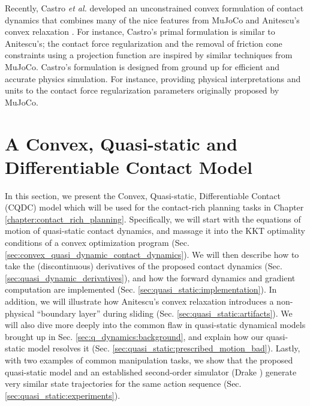 Recently, Castro \textit{et al.} developed an unconstrained convex formulation of contact dynamics \cite{castro2021unconstrained} that combines many of the nice features from MuJoCo \cite{todorov2012mujoco} and Anitescu's convex relaxation \cite{anitescu2006optimization}. For instance, Castro's primal formulation is similar to Anitescu's; the contact force regularization and the removal of friction cone constraints using a projection function are inspired by similar techniques from MuJoCo. 
Castro's formulation is designed from ground up for efficient and accurate physics simulation. For instance,  providing physical interpretations and units to the contact force regularization parameters originally proposed by MuJoCo.


\section{A Convex, Quasi-static and Differentiable Contact Model} \label{sec:q_dynamics:cqdc}
In this section, we present the Convex, Quasi-static, Differentiable Contact (CQDC) model which will be used for the contact-rich planning tasks in Chapter \ref{chapter:contact_rich_planning}. Specifically, we will start with the equations of motion of quasi-static contact dynamics, and massage it into the KKT optimality conditions of a convex optimization program (Sec. \ref{sec:convex_quasi_dynamic_contact_dynamics}). We will then describe how to take the (discontinuous) derivatives of the proposed contact dynamics (Sec. \ref{sec:quasi_dynamic_derivatives}), and how the forward dynamics and gradient computation are implemented (Sec. \ref{sec:quasi_static:implementation}). In addition, we will illustrate how Anitescu's convex relaxation introduces a non-physical ``boundary layer'' during sliding (Sec. \ref{sec:quasi_static:artifacts}). We will also dive more deeply into the common flaw in quasi-static dynamical models brought up in Sec. \ref{sec:q_dynamics:background}, and explain how our quasi-static model resolves it (Sec. \ref{sec:quasi_static:prescribed_motion_bad}). Lastly, with two examples of common manipulation tasks, we show that the proposed quasi-static model and an established second-order simulator (Drake \cite{drake}) generate very similar state trajectories for the same action sequence (Sec. \ref{sec:quasi_static:experiments}). 

